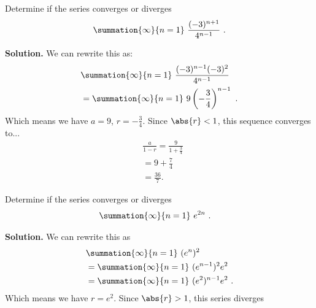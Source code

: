 \documentclass{report}
\begin{document}
    \bigbreak \noindent 
    \begin{eg}
        Determine if the series converges or diverges
        \begin{align*}
            \summation{\infty}{n=1}\ \frac{(-3)^{n+1}}{4^{n-1}} \ 
        .\end{align*}
    \end{eg}
    \bigbreak \noindent 
    \textbf{Solution.} We can rewrite this as:
    \begin{align*}
        &\summation{\infty}{n=1}\ \frac{(-3)^{n-1}(-3)^{2}}{4^{n-1}}\  \\
        &=\summation{\infty}{n=1}\ 9 \left(-\frac{3}{4}\right)^{n-1}\ 
    .\end{align*}
    \bigbreak \noindent 
    Which means we have $a=9$, $r = -\frac{3}{4} $. Since $\abs{r} < 1$, this sequence converges to...
    \begin{align*}
       &\frac{a}{1-r} = \frac{9}{1+\frac{3}{4}}  \\ 
       &=9+\frac{7}{4} \\
       &=\frac{36}{7}
    .\end{align*}
    \bigbreak \noindent 
    \begin{eg}
        Determine if the series converges or diverges
        \begin{align*}
            &\summation{\infty}{n=1}\ e^{2n}\ 
        .\end{align*}
    \end{eg}
    \bigbreak \noindent 
    \textbf{Solution.} We can rewrite this as 
    \begin{align*}
        &\summation{\infty}{n=1}\ (e^{n})^{2}\  \\
        &=\summation{\infty}{n=1}\ (e^{n-1})^{2}e^{2}\  \\
        &=\summation{\infty}{n=1}\ (e^{2})^{n-1}e^{2}\ 
    .\end{align*}
    \bigbreak \noindent 
    Which means we have $r=e^{2}$. Since $\abs{r} > 1$, this series diverges
\end{document}
